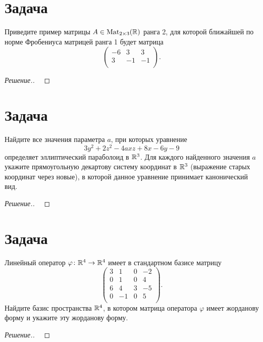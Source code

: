 \documentclass[a4paper]{article}
\newcommand{\Mat}{\operatorname{Mat}}
\theoremstyle{remark}
\begin{document}
    \section*{Задача }
        Приведите пример матрицы $A \in \Mat_{2\times 3}(\RR)$ ранга 2, для которой 
        ближайшей по норме Фробениуса матрицей ранга 1 будет матрица
        $$
        \begin{pmatrix}
            -6 & 3 & 3 \\
            3 & -1 & -1 \\
        \end{pmatrix}.
        $$
        \begin{proof}[Решение.] \ 
            

        \end{proof}

    \section*{Задача }
        Найдите все значения параметра $a$, при которых уравнение 
        $$ 
        3y^2 + 2z^2 -4axz + 8x - 6y - 9
        $$
        определяет эллиптический параболоид в $\mathbb{R}^3$. Для каждого найденного значения  $a$
        укажите прямоугольную декартову систему координат в $\mathbb{R}^3$ (выражение старых координат 
        через новые), в которой данное уравнение принимает канонический вид. 
        \begin{proof}[Решение.] \ 
            

        \end{proof}
    
    \section*{Задача }
        Линейный оператор $\varphi \colon \mathbb{R}^4 \to \mathbb{R}^4$ имеет в стандартном базисе матрицу
        $$
        \begin{pmatrix}
            3 & 1 & 0 & -2 \\
            0 & 1 & 0 & 4 \\
            6 & 4 & 3 & -5 \\
            0 & -1 & 0 & 5 \\
        \end{pmatrix}.
        $$
        Найдите базис пространства $\mathbb{R}^4$, в котором матрица оператора $\varphi$ 
        имеет жорданову форму и укажите эту жорданову форму.
        \begin{proof}[Решение.] \ 
            

        \end{proof}
      
\end{document}
